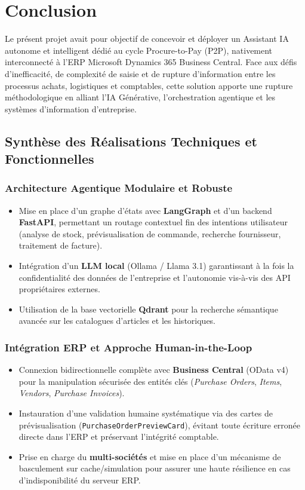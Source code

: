 
\chapter{Conclusion}

Le présent projet avait pour objectif de concevoir et déployer un Assistant IA autonome et intelligent dédié au cycle Procure-to-Pay (P2P), nativement interconnecté à l'ERP Microsoft Dynamics 365 Business Central. Face aux défis d'inefficacité, de complexité de saisie et de rupture d'information entre les processus achats, logistiques et comptables, cette solution apporte une rupture méthodologique en alliant l'IA Générative, l'orchestration agentique et les systèmes d'information d'entreprise.
 
\section{Synthèse des Réalisations Techniques et Fonctionnelles}
 
\subsection{Architecture Agentique Modulaire et Robuste}
 
\begin{itemize}
    \item Mise en place d'un graphe d'états avec \textbf{LangGraph} et d'un backend \textbf{FastAPI}, permettant un routage contextuel fin des intentions utilisateur (analyse de stock, prévisualisation de commande, recherche fournisseur, traitement de facture).
    \item Intégration d'un \textbf{LLM local} (Ollama / Llama 3.1) garantissant à la fois la confidentialité des données de l'entreprise et l'autonomie vis-à-vis des API propriétaires externes.
    \item Utilisation de la base vectorielle \textbf{Qdrant} pour la recherche sémantique avancée sur les catalogues d'articles et les historiques.
\end{itemize}
 
\subsection{Intégration ERP et Approche Human-in-the-Loop}
 
\begin{itemize}
    \item Connexion bidirectionnelle complète avec \textbf{Business Central} (OData v4) pour la manipulation sécurisée des entités clés (\textit{Purchase Orders}, \textit{Items}, \textit{Vendors}, \textit{Purchase Invoices}).
    \item Instauration d'une validation humaine systématique via des cartes de prévisualisation (\texttt{PurchaseOrderPreviewCard}), évitant toute écriture erronée directe dans l'ERP et préservant l'intégrité comptable.
    \item Prise en charge du \textbf{multi-sociétés} et mise en place d'un mécanisme de basculement sur cache/simulation pour assurer une haute résilience en cas d'indisponibilité du serveur ERP.
\end{itemize}
 
